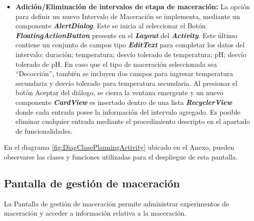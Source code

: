 \begin{itemize}
                    \item \textbf{Adición/Eliminación de intervalos de etapa de maceración:} La opción para definir un nuevo Intervalo de Maceración se implementa, mediante un componente \textbf{\textit{\gls{AlertDialog}}}. Este se inicia al seleccionar el Botón \textbf{\textit{\gls{FloatingActionButton}}} presente en el \textbf{\textit{\gls{Layout}}} del \textbf{\textit{\gls{Activity}}}. Este último contiene un conjunto de campos tipo \textbf{\textit{\gls{EditText}}} para completar los datos del intervalo: duración; temperatura; desvío tolerado de temperatura; pH; desvío tolerado de pH. En caso que el tipo de maceración seleccionada sea ``Decocción'', también se incluyen dos campos para ingresar temperatura secundaria y desvío tolerado para temperatura secundaria. Al presionar el botón Aceptar del diálogo, se cierra la ventana emergente y un nuevo componente \textbf{\textit{\gls{CardView}}} es insertado dentro de una lista \textbf{\textit{\gls{RecyclerView}}} donde cada entrada posee la información del intervalo agregado. Es posible eliminar cualquier entrada mediante el procedimiento descripto en el apartado de funcionalidades.
                \end{itemize}
                
                \par En el diagrama \ref{fig:DiagClasePlanningActivity} ubicado en el Anexo, pueden observarse las clases y funciones utilizadas para el despliegue de esta pantalla.
        
        \subsection{Pantalla de gestión de maceración}
        \label{DescripPantallaGestiónMaceración}
            \par La Pantalla de gestión de maceración permite administrar experimentos de maceración y acceder a información relativa a la maceración.
            
